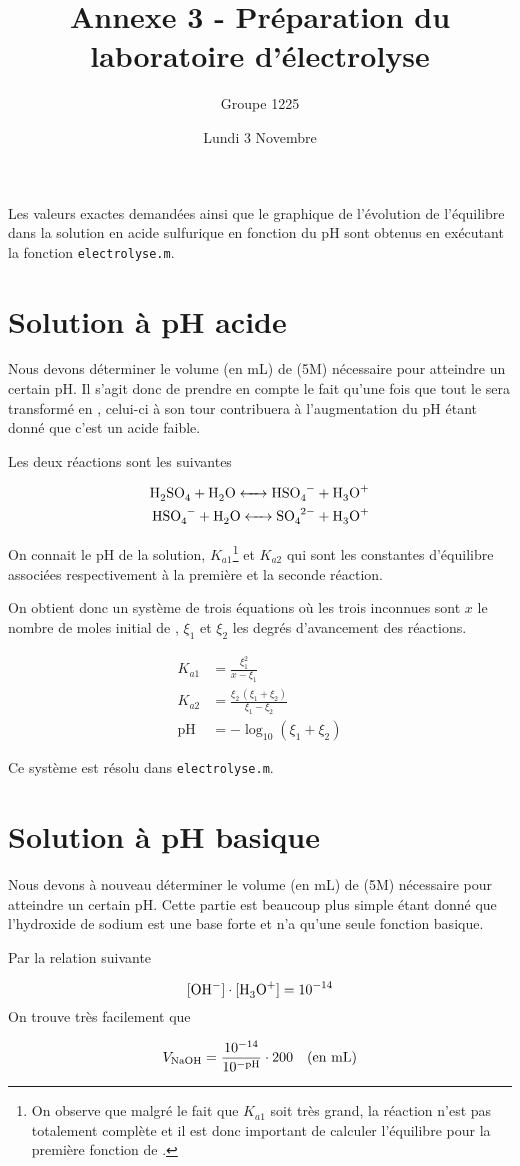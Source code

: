 \documentclass[12pt,oneside]{article}
\title{Annexe 3 - Préparation du laboratoire d'électrolyse}
\author{Groupe 1225}
\date{Lundi 3 Novembre}
\begin{document}
\maketitle

Les valeurs exactes demandées ainsi que le graphique de l'évolution de l'équilibre
dans la solution en acide sulfurique en fonction du pH sont obtenus en
exécutant la fonction \texttt{electrolyse.m}.

\section{Solution à pH acide}

Nous devons déterminer le volume (en \si{\milli\liter}) de  (5M)
nécessaire pour atteindre un certain pH.
Il s'agit donc de prendre en compte le fait qu'une fois que tout 
le  sera transformé en , celui-ci à son tour contribuera
à l'augmentation du pH étant donné que c'est un acide faible.

Les deux réactions sont les suivantes

\begin{align*}
	\ce{H2SO4 + H2O <-> HSO4- + H3O+} \\
	\ce{HSO4- + H2O <-> SO4^{2-} + H3O+}
\end{align*}

On connait le pH de la solution, $K_{a1}$\footnote{On observe que malgré le fait 
que $K_{a1}$ soit très grand, la réaction n'est pas totalement complète et il est
donc important de calculer l'équilibre pour la première fonction de .}
et $K_{a2}$ qui sont les constantes d'équilibre associées respectivement 
à la première et la seconde réaction.

On obtient donc un système de trois équations où les trois inconnues
sont $x$ le nombre de moles initial de , $\xi_1$ et $\xi_2$
les degrés d'avancement des réactions.

\begin{align*}
	K_{a1} &= \frac{\xi_1^2}{x - \xi_1} \\
	K_{a2} &= \frac{\xi_2 \, (\xi_1 + \xi_2)}{\xi_1 - \xi_2} \\
	\text{pH} &= - \log_{10}{(\xi_1 + \xi_2)} 
\end{align*}

Ce système est résolu dans \texttt{electrolyse.m}.

\section{Solution à pH basique}

Nous devons à nouveau déterminer le volume (en \si{\milli\liter}) 
de  (5M) nécessaire pour atteindre un certain pH.
Cette partie est beaucoup plus simple étant donné que l'hydroxide de sodium
est une base forte et n'a qu'une seule fonction basique.

Par la relation suivante

\[
	[\ce{OH-}] \cdot [\ce{H3O+}] = 10^{-14} 
\]
On trouve très facilement que 

\[
	V_{\ce{NaOH}} = \frac{10^{-14}}{10^{- \text{pH}}} \cdot 200 
	\quad \text{(en \si{\milli\liter})}
\]
\end{document}
